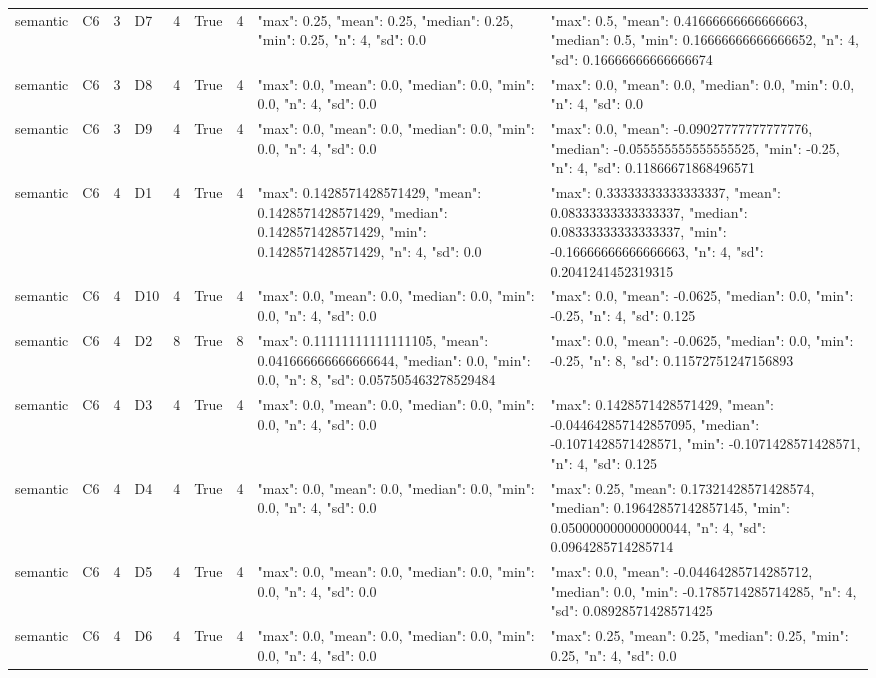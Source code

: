 \begin{tabular}{lllllllll}
semantic & C6 & 3 & D7 & 4 & True & 4 & {"max": 0.25, "mean": 0.25, "median": 0.25, "min": 0.25, "n": 4, "sd": 0.0} & {"max": 0.5, "mean": 0.41666666666666663, "median": 0.5, "min": 0.16666666666666652, "n": 4, "sd": 0.16666666666666674} \\
semantic & C6 & 3 & D8 & 4 & True & 4 & {"max": 0.0, "mean": 0.0, "median": 0.0, "min": 0.0, "n": 4, "sd": 0.0} & {"max": 0.0, "mean": 0.0, "median": 0.0, "min": 0.0, "n": 4, "sd": 0.0} \\
semantic & C6 & 3 & D9 & 4 & True & 4 & {"max": 0.0, "mean": 0.0, "median": 0.0, "min": 0.0, "n": 4, "sd": 0.0} & {"max": 0.0, "mean": -0.09027777777777776, "median": -0.055555555555555525, "min": -0.25, "n": 4, "sd": 0.11866671868496571} \\
semantic & C6 & 4 & D1 & 4 & True & 4 & {"max": 0.1428571428571429, "mean": 0.1428571428571429, "median": 0.1428571428571429, "min": 0.1428571428571429, "n": 4, "sd": 0.0} & {"max": 0.33333333333333337, "mean": 0.08333333333333337, "median": 0.08333333333333337, "min": -0.16666666666666663, "n": 4, "sd": 0.2041241452319315} \\
semantic & C6 & 4 & D10 & 4 & True & 4 & {"max": 0.0, "mean": 0.0, "median": 0.0, "min": 0.0, "n": 4, "sd": 0.0} & {"max": 0.0, "mean": -0.0625, "median": 0.0, "min": -0.25, "n": 4, "sd": 0.125} \\
semantic & C6 & 4 & D2 & 8 & True & 8 & {"max": 0.11111111111111105, "mean": 0.041666666666666644, "median": 0.0, "min": 0.0, "n": 8, "sd": 0.057505463278529484} & {"max": 0.0, "mean": -0.0625, "median": 0.0, "min": -0.25, "n": 8, "sd": 0.11572751247156893} \\
semantic & C6 & 4 & D3 & 4 & True & 4 & {"max": 0.0, "mean": 0.0, "median": 0.0, "min": 0.0, "n": 4, "sd": 0.0} & {"max": 0.1428571428571429, "mean": -0.044642857142857095, "median": -0.1071428571428571, "min": -0.1071428571428571, "n": 4, "sd": 0.125} \\
semantic & C6 & 4 & D4 & 4 & True & 4 & {"max": 0.0, "mean": 0.0, "median": 0.0, "min": 0.0, "n": 4, "sd": 0.0} & {"max": 0.25, "mean": 0.17321428571428574, "median": 0.19642857142857145, "min": 0.050000000000000044, "n": 4, "sd": 0.0964285714285714} \\
semantic & C6 & 4 & D5 & 4 & True & 4 & {"max": 0.0, "mean": 0.0, "median": 0.0, "min": 0.0, "n": 4, "sd": 0.0} & {"max": 0.0, "mean": -0.04464285714285712, "median": 0.0, "min": -0.1785714285714285, "n": 4, "sd": 0.08928571428571425} \\
semantic & C6 & 4 & D6 & 4 & True & 4 & {"max": 0.0, "mean": 0.0, "median": 0.0, "min": 0.0, "n": 4, "sd": 0.0} & {"max": 0.25, "mean": 0.25, "median": 0.25, "min": 0.25, "n": 4, "sd": 0.0} \\

\end{tabular}
